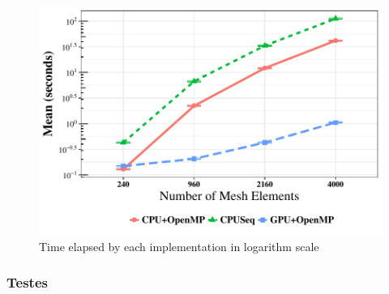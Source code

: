 \documentclass{beamer}
\begin{document}
\begin{frame}

\begin{figure}[ht]
\centering
\includegraphics[scale=0.7]{results1.pdf}
\caption{Time elapsed by each implementation in logarithm scale}
\label{fig:graphic1}
\end{figure}

\end{frame}

\begin{frame}
\frametitle{Testes}

\end{frame}
\end{document}
